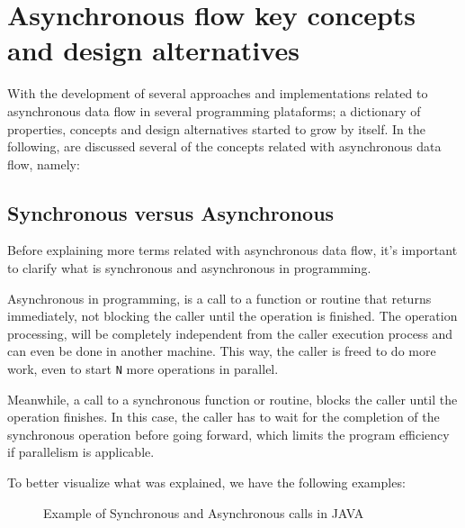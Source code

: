 
\section{Asynchronous flow key concepts and design alternatives} %
\label{sec:async_concepts}

With the development of several approaches and implementations related to asynchronous data flow in several programming plataforms; a dictionary
of properties, concepts and design alternatives started to grow by itself. In the following, are discussed several of the concepts related with asynchronous data flow, namely:


\subsection{Synchronous versus Asynchronous}

	Before explaining more terms related with asynchronous data flow, it's important to clarify what is synchronous and asynchronous in programming. 
	
	Asynchronous in programming, is a call to a function or routine that returns immediately, not blocking the caller until the operation is finished. The operation processing, will be completely independent from the caller execution process and can even be done in another machine. This way, the caller is freed to do more work, even to start \texttt{N} more operations in parallel. 
	
	Meanwhile, a call to a synchronous function or routine, blocks the caller until the operation finishes. In this case, the caller has to wait for the completion of the synchronous operation before going forward, which limits the program efficiency if parallelism is applicable.

	To better visualize what was explained, we have the following examples: 


	\begin{figure}[H]
		\centering
		\begin{subfigure}[h]{1.2\textwidth}
			\centering
			\caption{}
			\label{fig:ra-vectorial}
		 \end{subfigure}	
	\qquad
		 \begin{subfigure}[h]{1.2\textwidth}
			\centering
			\caption{}
			\label{fig:ra-raster}
		\end{subfigure}		
	  \caption{Example of Synchronous and Asynchronous calls in JAVA}
	  \label{fig:figura-completa}
	\end{figure}
	\clearpage

